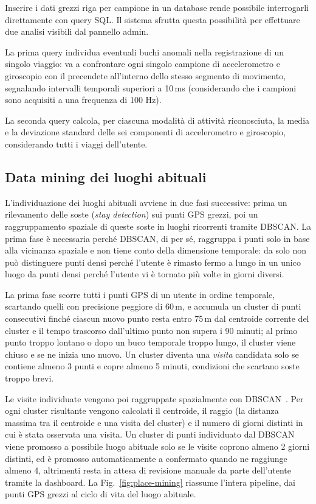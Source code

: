 \documentclass[conference]{IEEEtran}
\begin{document}
Inserire i dati grezzi riga per campione in un database rende possibile interrogarli
direttamente con query SQL.
Il sistema sfrutta questa possibilità per effettuare due analisi visibili dal pannello admin.

La prima query individua eventuali buchi anomali nella registrazione di un singolo viaggio:
va a confrontare ogni singolo campione di accelerometro e giroscopio con il precendete all'interno dello stesso segmento di movimento, 
segnalando intervalli temporali superiori a 10\,ms (considerando che i campioni sono acquisiti a una frequenza di 100 Hz). 

La seconda query calcola, per ciascuna modalità di attività riconosciuta, la media e la deviazione standard delle 
sei componenti di accelerometro e giroscopio, considerando tutti i viaggi dell’utente.

\subsection{Data mining dei luoghi abituali}

L'individuazione dei luoghi abituali avviene in due fasi successive:
prima un rilevamento delle soste (\emph{stay detection}) sui punti GPS
grezzi, poi un raggruppamento spaziale di queste soste in luoghi
ricorrenti tramite DBSCAN. La prima fase è necessaria perché DBSCAN,
di per sé, raggruppa i punti solo in base alla vicinanza spaziale e
non tiene conto della dimensione temporale: da solo non può distinguere
punti densi perché l'utente è rimasto fermo a lungo in un unico luogo
da punti densi perché l'utente vi è tornato più volte in giorni
diversi.

La prima fase scorre tutti i punti GPS di un utente in ordine temporale,
scartando quelli con precisione peggiore di 60\,m, e accumula un
cluster di punti consecutivi finché ciascun nuovo punto resta entro
75\,m dal centroide corrente del cluster e il tempo trascorso
dall'ultimo punto non supera i 90 minuti; al primo punto troppo
lontano o dopo un buco temporale troppo lungo, il cluster viene chiuso
e se ne inizia uno nuovo. Un cluster diventa una \emph{visita}
candidata solo se contiene almeno 3 punti e copre almeno 5 minuti,
condizioni che scartano soste troppo brevi.

Le visite individuate vengono poi raggruppate spazialmente con
DBSCAN~\cite{ester1996dbscan}.
Per ogni cluster risultante vengono calcolati il centroide, il raggio (la distanza massima tra il
centroide e una visita del cluster) e il numero di giorni distinti in
cui è stata osservata una visita. Un cluster di punti individuato dal DBSCAN viene 
promosso a possibile luogo abituale solo se le visite coprono almeno 2 giorni distinti,
ed è promosso automaticamente a confermato quando ne raggiunge almeno 4,
altrimenti resta in attesa di revisione manuale da parte dell'utente
tramite la dashboard. La Fig.~\ref{fig:place-mining} riassume l'intera
pipeline, dai punti GPS grezzi al ciclo di vita del luogo abituale.
\end{document}
